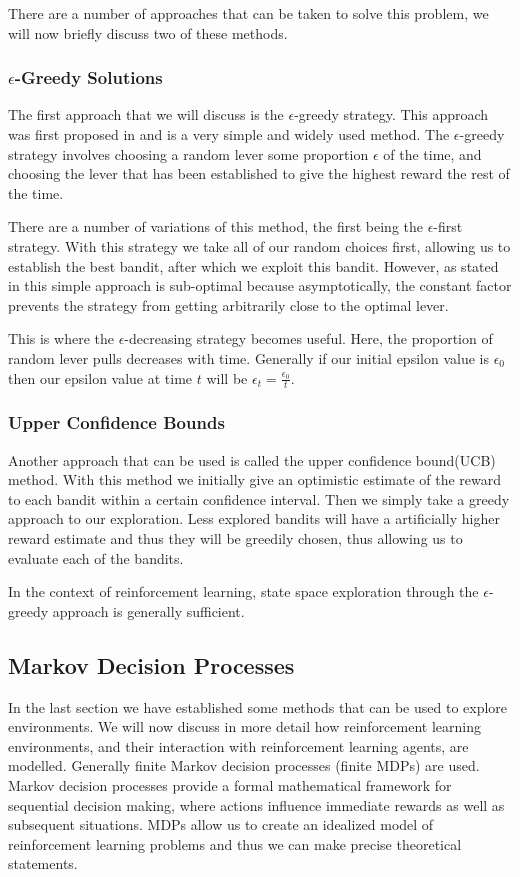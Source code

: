 There are a number of approaches that can be taken to solve this problem, we will now briefly discuss two of these
methods.

\subsubsection{$\epsilon$-Greedy Solutions}\label{subsec:eGreedy}
The first approach that we will discuss is the $\epsilon$-greedy strategy.
This approach was first proposed in\citep{watkins1989learning} and is a very simple and widely used method.
The $\epsilon$-greedy strategy involves choosing a random lever some proportion $\epsilon$ of the time, and
choosing the lever that has been established to give the highest reward the rest of the time.

There are a number of variations of this method, the first being the $\epsilon$-first strategy.
With this strategy we take all of our random choices first, allowing us to establish the best bandit,
after which we exploit this bandit.
However, as stated in\citep{vermorel2005multi} this simple approach is sub-optimal because asymptotically,
the constant factor prevents the strategy from getting arbitrarily close to
the optimal lever.

This is where the $\epsilon$-decreasing strategy becomes useful.
Here, the proportion of random lever pulls decreases with time.
Generally if our initial epsilon value is $\epsilon_0$ then our epsilon value at time $t$ will be
$\epsilon_t = \frac{\epsilon_0}{t}$.

\subsubsection{Upper Confidence Bounds}
Another approach that can be used is called the upper confidence bound(UCB) method.
With this method we initially give an optimistic estimate of the reward to each bandit within a certain
confidence interval.
Then we simply take a greedy approach to our exploration.
Less explored bandits will have a artificially higher reward estimate and thus they will be greedily chosen,
thus allowing us to evaluate each of the bandits.

In the context of reinforcement learning, state space exploration through the $\epsilon$-greedy approach is
generally sufficient.

\subsection{Markov Decision Processes}\label{subsec:mdp}
In the last section we have established some methods that can be used to explore environments.
We will now discuss in more detail how reinforcement learning environments, and their interaction
with reinforcement learning agents, are modelled.
Generally finite Markov decision processes (finite MDPs) are used.
Markov decision processes provide a formal mathematical framework for sequential decision making,
where actions influence immediate rewards as well as subsequent situations\citep{sutton1998reinforcement}.
MDPs allow us to create an idealized model of reinforcement learning problems and thus we can make precise
theoretical statements.

